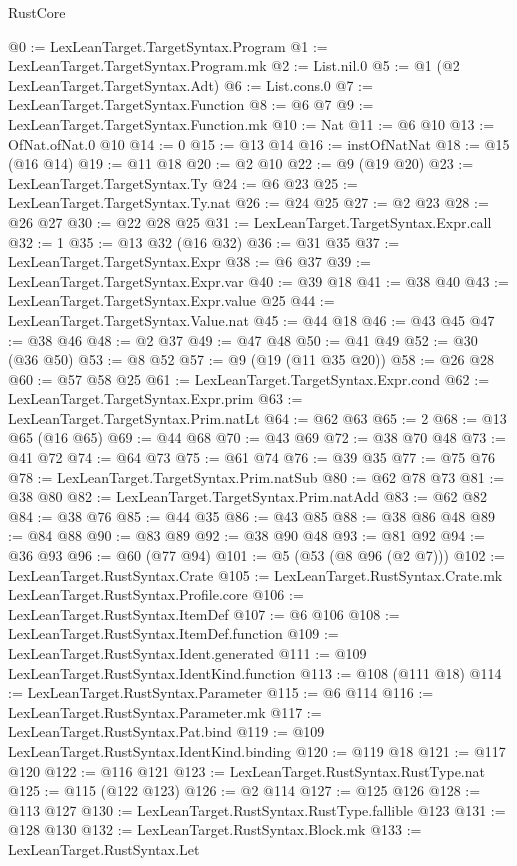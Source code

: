 \begin{lexlean}{RustCore}
\begin{coremodule}
@0 := LexLeanTarget.TargetSyntax.Program
@1 := LexLeanTarget.TargetSyntax.Program.mk
@2 := List.nil.{0}
@5 := @1 (@2 LexLeanTarget.TargetSyntax.Adt)
@6 := List.cons.{0}
@7 := LexLeanTarget.TargetSyntax.Function
@8 := @6 @7
@9 := LexLeanTarget.TargetSyntax.Function.mk
@10 := Nat
@11 := @6 @10
@13 := OfNat.ofNat.{0} @10
@14 := 0
@15 := @13 @14
@16 := instOfNatNat
@18 := @15 (@16 @14)
@19 := @11 @18
@20 := @2 @10
@22 := @9 (@19 @20)
@23 := LexLeanTarget.TargetSyntax.Ty
@24 := @6 @23
@25 := LexLeanTarget.TargetSyntax.Ty.nat
@26 := @24 @25
@27 := @2 @23
@28 := @26 @27
@30 := @22 @28 @25
@31 := LexLeanTarget.TargetSyntax.Expr.call
@32 := 1
@35 := @13 @32 (@16 @32)
@36 := @31 @35
@37 := LexLeanTarget.TargetSyntax.Expr
@38 := @6 @37
@39 := LexLeanTarget.TargetSyntax.Expr.var
@40 := @39 @18
@41 := @38 @40
@43 := LexLeanTarget.TargetSyntax.Expr.value @25
@44 := LexLeanTarget.TargetSyntax.Value.nat
@45 := @44 @18
@46 := @43 @45
@47 := @38 @46
@48 := @2 @37
@49 := @47 @48
@50 := @41 @49
@52 := @30 (@36 @50)
@53 := @8 @52
@57 := @9 (@19 (@11 @35 @20))
@58 := @26 @28
@60 := @57 @58 @25
@61 := LexLeanTarget.TargetSyntax.Expr.cond
@62 := LexLeanTarget.TargetSyntax.Expr.prim
@63 := LexLeanTarget.TargetSyntax.Prim.natLt
@64 := @62 @63
@65 := 2
@68 := @13 @65 (@16 @65)
@69 := @44 @68
@70 := @43 @69
@72 := @38 @70 @48
@73 := @41 @72
@74 := @64 @73
@75 := @61 @74
@76 := @39 @35
@77 := @75 @76
@78 := LexLeanTarget.TargetSyntax.Prim.natSub
@80 := @62 @78 @73
@81 := @38 @80
@82 := LexLeanTarget.TargetSyntax.Prim.natAdd
@83 := @62 @82
@84 := @38 @76
@85 := @44 @35
@86 := @43 @85
@88 := @38 @86 @48
@89 := @84 @88
@90 := @83 @89
@92 := @38 @90 @48
@93 := @81 @92
@94 := @36 @93
@96 := @60 (@77 @94)
@101 := @5 (@53 (@8 @96 (@2 @7)))
@102 := LexLeanTarget.RustSyntax.Crate
@105 := LexLeanTarget.RustSyntax.Crate.mk LexLeanTarget.RustSyntax.Profile.core
@106 := LexLeanTarget.RustSyntax.ItemDef
@107 := @6 @106
@108 := LexLeanTarget.RustSyntax.ItemDef.function
@109 := LexLeanTarget.RustSyntax.Ident.generated
@111 := @109 LexLeanTarget.RustSyntax.IdentKind.function
@113 := @108 (@111 @18)
@114 := LexLeanTarget.RustSyntax.Parameter
@115 := @6 @114
@116 := LexLeanTarget.RustSyntax.Parameter.mk
@117 := LexLeanTarget.RustSyntax.Pat.bind
@119 := @109 LexLeanTarget.RustSyntax.IdentKind.binding
@120 := @119 @18
@121 := @117 @120
@122 := @116 @121
@123 := LexLeanTarget.RustSyntax.RustType.nat
@125 := @115 (@122 @123)
@126 := @2 @114
@127 := @125 @126
@128 := @113 @127
@130 := LexLeanTarget.RustSyntax.RustType.fallible @123
@131 := @128 @130
@132 := LexLeanTarget.RustSyntax.Block.mk
@133 := LexLeanTarget.RustSyntax.Let

\end{coremodule}
\end{lexlean}
